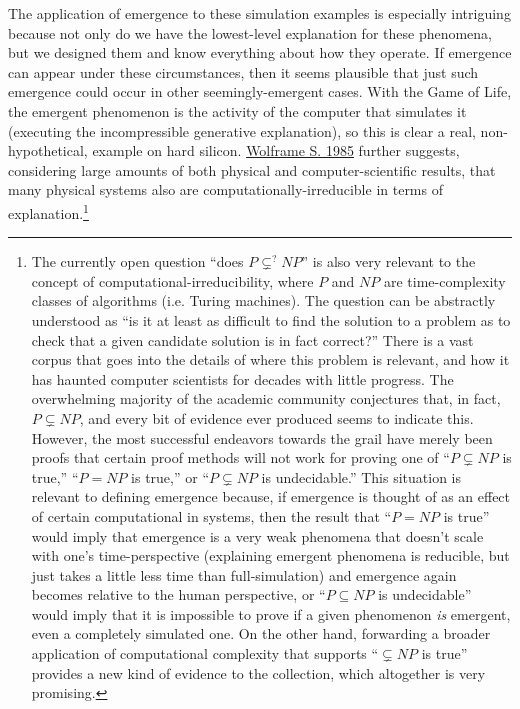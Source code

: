 \documentclass{article}
\newcommand{\ti}[1]{\textit{#1}}
\renewcommand{\cite}[1]{\hyperlink{#1}{#1}}
\begin{document}

The application of emergence to these simulation examples is especially intriguing because not only do we have the lowest-level explanation for these phenomena, but we designed them and know everything about how they operate. If emergence can appear under these circumstances, then it seems plausible that just such emergence could occur in other seemingly-emergent cases. With the Game of Life, the emergent phenomenon is the activity of the computer that simulates it (executing the incompressible generative explanation), so this is clear a real, non-hypothetical, example on hard silicon. \cite{Wolframe S. 1985} further suggests, considering large amounts of both physical and computer-scientific results, that many physical systems also are computationally-irreducible in terms of explanation.\footnote{The currently open question ``does $P \subsetneq^? NP$'' is also very relevant to the concept of computational-irreducibility, where $P$ and $NP$ are time-complexity classes of algorithms (i.e. Turing machines). The question can be abstractly understood as ``is it at least as difficult to find the solution to a problem as to check that a given candidate solution is in fact correct?'' There is a vast corpus that goes into the details of where this problem is relevant, and how it has haunted computer scientists for decades with little progress. The overwhelming majority of the academic community conjectures that, in fact, $P \subsetneq NP$, and every bit of evidence ever produced seems to indicate this. However, the most successful endeavors towards the grail have merely been proofs that certain proof methods will not work for proving one of ``$P \subsetneq NP$ is true,'' ``$P = NP$ is true,'' or ``$P \subsetneq NP$ is undecidable.'' This situation is relevant to defining emergence because, if emergence is thought of as an effect of certain computational in systems, then the result that ``$P = NP$ is true'' would imply that emergence is a very weak phenomena that doesn't scale with one's time-perspective (explaining emergent phenomena is reducible, but just takes a little less time than full-simulation) and emergence again becomes relative to the human perspective, or ``$P \subseteq NP$ is undecidable'' would imply that it is impossible to prove if a given phenomenon \ti{is} emergent, even a completely simulated one. On the other hand, forwarding a broader application of computational complexity that supports ``$ \subsetneq NP$ is true'' provides a new kind of evidence to the collection, which altogether is very promising. }
\end{document}
